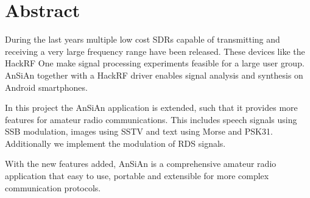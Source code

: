 \begingroup
\let\clearpage\relax
\let\cleardoublepage\relax
\let\cleardoublepage\relax

\chapter*{Abstract}

	During the last years multiple low cost \acp{SDR} capable of transmitting and receiving a very large frequency range have been released. These devices like the HackRF One make signal processing experiments feasible for a large user group. AnSiAn together with a HackRF driver enables signal analysis and synthesis on Android smartphones. 
	
	In this project the \ac{AnSiAn} application is extended, such that it provides more features for amateur radio communications. This includes speech signals using \ac{SSB} modulation, images using \ac{SSTV} and text using Morse and PSK31. Additionally we implement the modulation of \ac{RDS} signals. 
	
	With the new features added, AnSiAn is a comprehensive amateur radio application that easy to use, portable and extensible for more complex communication protocols. 





\endgroup			


